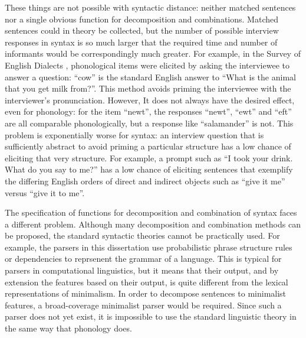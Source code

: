 These things are not possible with syntactic distance: neither matched
sentences nor a single obvious function for decomposition and
combinations. Matched sentences could in theory be collected, but the
number of possible interview responses in syntax is so much larger
that the required time and number of informants would be
correspondingly much greater. For example, in the Survey of English
Dialects \cite{orton63}, phonological items were elicited by asking
the interviewee to answer a question: ``cow'' is the standard English
answer to ``What is the animal that you get milk from?''. This method
avoids priming the interviewee with the interviewer's
pronunciation. However, It does not always have the desired effect,
even for phonology: for the item ``newt'', the responses ``newt'',
``ewt'' and ``eft'' are all comparable phonologically, but a response
like ``salamander'' is not. This problem is exponentially worse for
syntax: an interview question that is sufficiently abstract to avoid
priming a particular structure has a low chance of eliciting that very
structure. For example, a prompt such as ``I took your drink. What do
you say to me?'' has a low chance of eliciting sentences that
exemplify the differing English orders of direct and indirect objects
such as ``give it me'' versus ``give it to me''.

The specification of functions for decomposition and combination of
syntax faces a different problem. Although many decomposition and
combination methods can be proposed, the standard syntactic theories
cannot be practically used. For example, the parsers in this
dissertation use probabilistic phrase structure rules or dependencies
to reprsenent the grammar of a language. This is typical for parsers
in computational linguistics, but it means that their output, and by
extension the features based on their output, is quite different from
the lexical representations of minimalism. In order to decompose
sentences to minimalist features, a broad-coverage minimalist parser
would be required. Since such a parser does not yet exist, it is
impossible to use the standard linguistic theory in the same way that
phonology does.



